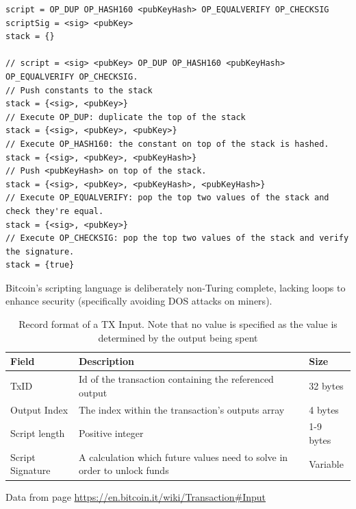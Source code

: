 \begin{verbatim}
script = OP_DUP OP_HASH160 <pubKeyHash> OP_EQUALVERIFY OP_CHECKSIG
scriptSig = <sig> <pubKey>
stack = {}

// script = <sig> <pubKey> OP_DUP OP_HASH160 <pubKeyHash> OP_EQUALVERIFY OP_CHECKSIG.
// Push constants to the stack
stack = {<sig>, <pubKey>}
// Execute OP_DUP: duplicate the top of the stack
stack = {<sig>, <pubKey>, <pubKey>}
// Execute OP_HASH160: the constant on top of the stack is hashed.
stack = {<sig>, <pubKey>, <pubKeyHash>}
// Push <pubKeyHash> on top of the stack.
stack = {<sig>, <pubKey>, <pubKeyHash>, <pubKeyHash>}
// Execute OP_EQUALVERIFY: pop the top two values of the stack and check they're equal.
stack = {<sig>, <pubKey>}
// Execute OP_CHECKSIG: pop the top two values of the stack and verify the signature.
stack = {true}
\end{verbatim}

Bitcoin's scripting language is deliberately non-Turing complete, lacking loops to enhance security
(specifically avoiding DOS attacks on miners).

\begin{table}[htbp!]
  \small
  \centering
  \begin{tabularx}{\textwidth}{|l|X|X|}
    \hline
    \textbf{Field}          & \textbf{Description} & \textbf{Size} \\ \hline
    TxID & Id of the transaction containing the referenced output & 32 bytes \\ \hline
    Output Index & The index within the transaction's outputs array & 4 bytes \\ \hline
    Script length     & Positive integer                                          & 1-9 bytes               \\ \hline
    Script Signature       & A calculation which future values need to solve in order to unlock funds &
    Variable                         \\ \hline
  \end{tabularx}
  \caption{Record format of a TX Input. Note that no value is specified as the value is determined by the
  output being spent}
  \label{table:bitcoin_input_format}
  \begin{minipage}{\textwidth}
    \begin{center}
      \footnotesize{Data from \cite{BitcoinWiki} page \url{https://en.bitcoin.it/wiki/Transaction#Input}}
    \end{center}
  \end{minipage}
\end{table}

